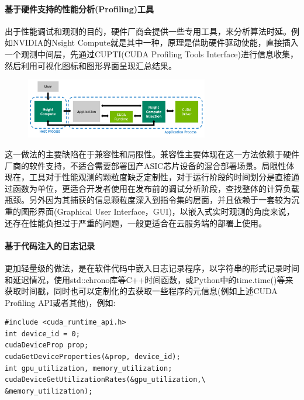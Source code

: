 \documentclass[master,anonymous]{shtthesis}
\begin{document}
\paragraph{基于硬件支持的性能分析(Profiling)工具}

出于性能调试和观测的目的，硬件厂商会提供一些专用工具，来分析算法时延。例如NVIDIA的Nsight Compute\cite{yang2020hierarchical}就是其中一种，原理是借助硬件驱动使能，直接插入一个观测中间层，先通过CUPTI(CUDA Profiling Tools Interface)进行信息收集，然后利用可视化图标和图形界面呈现汇总结果。

\begin{figure}[htbp]
	\centering
	\includegraphics[width=8cm]{img/nsight.png}
	\label{NsightCompute的观测原理}
\end{figure}


这一做法的主要缺陷在于兼容性和局限性。兼容性主要体现在这一方法依赖于硬件厂商的软件支持，不适合需要部署国产ASIC芯片设备的混合部署场景。局限性体现在，工具对于性能观测的颗粒度缺乏定制性，对于运行阶段的时间划分是直接通过函数为单位，更适合开发者使用在发布前的调试分析阶段，查找整体的计算负载瓶颈。另外因为其捕获的信息颗粒度深入到指令集的层面，并且依赖于一套较为沉重的图形界面(Graphical User Interface，GUI)，以嵌入式实时观测的角度来说，还存在性能负担过于严重的问题，一般更适合在云服务端的部署上使用。

\paragraph{基于代码注入的日志记录}
更加轻量级的做法，是在软件代码中嵌入日志记录程序，以字符串的形式记录时间和延迟情况，使用std::chrono库等C++时间函数，或Python中的time.time()等来获取时间戳，同时也可以定制化的去获取一些程序的元信息(例如上述CUDA Profiling API或者其他)，例如:
\begin{lstlisting}[caption={使用CUDA Profiling API读取GPU状态信息},captionpos=b]
#include <cuda_runtime_api.h>
int device_id = 0;
cudaDeviceProp prop;
cudaGetDeviceProperties(&prop, device_id);
int gpu_utilization, memory_utilization;
cudaDeviceGetUtilizationRates(&gpu_utilization,\
&memory_utilization);
\end{lstlisting}
\end{document}
